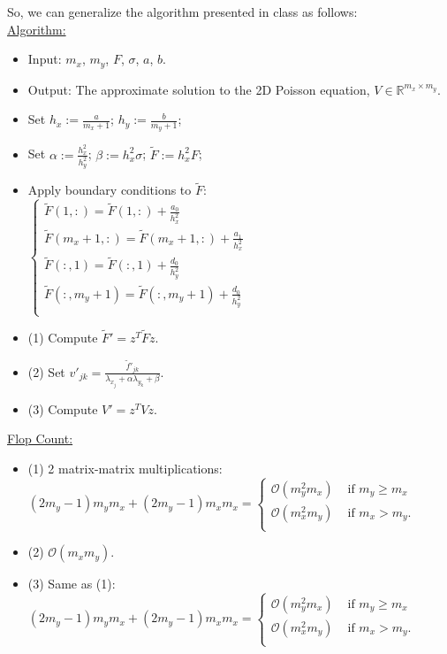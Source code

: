 \documentclass[12pt]{article}
\def\R{\mathbb{R}}
\begin{document}
\begin{itemize}
So, we can generalize the algorithm presented in class as follows:\\

\underline{Algorithm:}\\
\begin{itemize}
\item Input: $m_x$, $m_y$, $F$, $\sigma$, $a$, $b$.
\item Output: The approximate solution to the 2D Poisson equation, $V \in \R^{m_x\times m_y}$.\\
\item Set $h_x := \frac{a}{m_x + 1}$; $h_y := \frac{b}{m_y + 1}$;
\item Set $\alpha := \frac{h_x^2}{h_y^2}$; $\beta := h_x^2\sigma$; $\tilde{F} := h_x^2F$;
\item Apply boundary conditions to $\tilde{F}$:\\
$\begin{cases}
\tilde{F}(1,:) = \tilde{F}(1,:) + \frac{a_0}{h_x^2} \\
\tilde{F}(m_x + 1,:) = \tilde{F}(m_x + 1,:) + \frac{a_1}{h_x^2} \\
\tilde{F}(:,1) = \tilde{F}(:,1) + \frac{d_0}{h_y^2} \\
\tilde{F}(:,m_y + 1) = \tilde{F}(:,m_y + 1) + \frac{d_0}{h_y^2} \\
\end{cases}$
\item (1) Compute $\tilde{F}' = z^T\tilde{F}z$.
\item (2) Set $v'_{jk} = \frac{\tilde{f}'_{jk}}{\lambda_{x_j} + \alpha \lambda_{y_k} + \beta}$.
\item (3) Compute $V' = z^TVz$.\\
\end{itemize}

\underline{Flop Count:}
\begin{itemize}
\item (1) 2 matrix-matrix multiplications:\\
$(2m_y - 1)m_ym_x + (2m_y - 1)m_xm_x = \begin{cases}
				\mathcal{O}(m_y^2m_x) & \text{ if } m_y \geq m_x \\
				\mathcal{O}(m_x^2m_y) & \text{ if } m_x > m_y. \\
										\end{cases}$
\item (2) $\mathcal{O}(m_xm_y)$.
\item (3) Same as (1):\\
$(2m_y - 1)m_ym_x + (2m_y - 1)m_xm_x = \begin{cases}
				\mathcal{O}(m_y^2m_x) & \text{ if } m_y \geq m_x \\
				\mathcal{O}(m_x^2m_y) & \text{ if } m_x > m_y. \\
										\end{cases}$
\end{itemize} 


\end{itemize}
\end{document}
